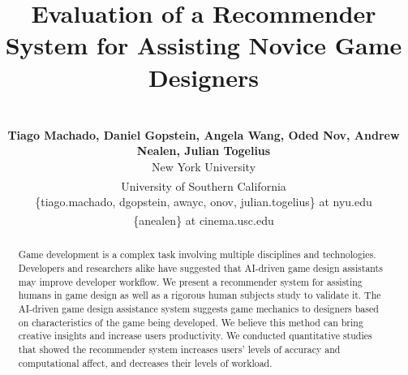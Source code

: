 \documentclass[letterpaper]{article} %
\title{Evaluation of a Recommender System for Assisting Novice Game Designers}
\author{\Large \textbf{} \\ \Large \textbf{Tiago Machado, Daniel Gopstein, Angela Wang, Oded Nov, \textsuperscript{\rm *}Andrew Nealen, Julian Togelius}\\ %
New York University\\
\textsuperscript{\rm *} University of Southern California\\
\{tiago.machado, dgopstein, awayc, onov, julian.togelius\} at nyu.edu \\%
\textsuperscript{\rm*}\{anealen\} at cinema.usc.edu
}
\newcommand{\dan}[1]{\textcolor{orange}{Dan: \textbf{#1}}}
\begin{document}
\maketitle

\begin{abstract}
Game development is a complex task involving multiple
disciplines  and  technologies.
Developers and researchers alike have suggested that AI-driven game design assistants may improve developer workflow.
We
present a recommender system for assisting humans in game
design as well as a rigorous human subjects study to validate it.  The AI-driven game design assistance system suggests game mechanics to designers based on characteristics of the game
being developed.  We believe this method can
bring creative insights and increase users productivity.  We
conducted quantitative studies that showed the recommender system increases
users' levels of accuracy and computational affect, and decreases their levels
of workload.
\end{abstract}
\end{document}
